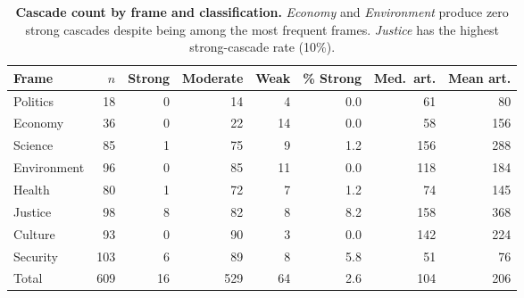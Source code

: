 \begin{table}[h]
\centering
\renewcommand{\arraystretch}{1.15}
\caption{\textbf{Cascade count by frame and classification.}
\emph{Economy} and \emph{Environment} produce zero strong cascades
despite being among the most frequent frames.
\emph{Justice} has the highest strong-cascade rate (10\%).}
\label{tab:si_cascade_class}
\vspace{0.3em}
\small
\begin{tabular}{@{}l r r r r r r r@{}}
\toprule
Frame & $n$ & Strong & Moderate & Weak & \% Strong & Med.\ art. & Mean art. \\
\midrule
Politics & 18 & 0 & 14 & 4 & 0.0 & 61 & 80 \\
Economy & 36 & 0 & 22 & 14 & 0.0 & 58 & 156 \\
Science & 85 & 1 & 75 & 9 & 1.2 & 156 & 288 \\
Environment & 96 & 0 & 85 & 11 & 0.0 & 118 & 184 \\
Health & 80 & 1 & 72 & 7 & 1.2 & 74 & 145 \\
Justice & 98 & 8 & 82 & 8 & 8.2 & 158 & 368 \\
Culture & 93 & 0 & 90 & 3 & 0.0 & 142 & 224 \\
Security & 103 & 6 & 89 & 8 & 5.8 & 51 & 76 \\
\midrule
Total & 609 & 16 & 529 & 64 & 2.6 & 104 & 206 \\
\bottomrule
\end{tabular}
\end{table}
